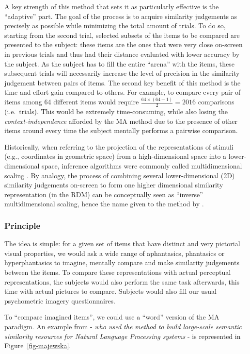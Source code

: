 \documentclass[
  authoryear]{elsarticle}
\begin{document}
A key strength of this method that sets it as particularly effective is
the ``adaptive'' part. The goal of the process is to acquire similarity
judgements as precisely as possible while minimizing the total amount of
trials. To do so, starting from the second trial, selected subsets of
the items to be compared are presented to the subject: these items are
the ones that were very close on-screen in previous trials and thus had
their distance evaluated with lower accuracy by the subject. As the
subject has to fill the entire ``arena'' with the items, these
subsequent trials will necessarily increase the level of precision in
the similarity judgement between pairs of items. The second key benefit
of this method is the time and effort gain compared to others. For
example, to compare every pair of items among 64 different items would
require \(\frac{64 \times (64-1)}{2} = 2016\) comparisons (i.e.~trials).
This would be extremely time-consuming, while also losing the
\emph{context-independence} afforded by the MA method due to the
presence of other items around every time the subject mentally performs
a pairwise comparison.

Historically, when referring to the projection of the representations of
stimuli (e.g., coordinates in geometric space) from a high-dimensional
space into a lower-dimensional space, inference algorithms were commonly
called multidimensional scaling \citep{roads2024}. By analogy, the
process of combining several lower-dimensional (2D) similarity
judgements on-screen to form one higher dimensional similarity
representation (in the RDM) can be conceptually seen as ``inverse''
multidimensional scaling, hence the name given to the method by
\citet{kriegeskorteInverseMDSInferring2012}.

\subsubsection{Principle}\label{sec-principle}

The idea is simple: for a given set of items that have distinct and very
pictorial visual properties, we would ask a wide range of aphantasics,
phantasics or hyperphantasics to imagine, mentally compare and make
similarity judgements between the items. To compare these
representations with actual perceptual representations, the subjects
would also perform the same task afterwards, this time with actual
pictures to compare. Subjects would also fill our usual psychometric
imagery questionnaires.

To ``compare imagined items'', we could use a ``word'' version of the MA
paradigm. An example from
\citet{majewskaSpatialMultiarrangementClustering2020} - \emph{who used
the method to build large-scale semantic similarity resources for
Natural Language Processing systems} - is represented in
Figure~\ref{fig-majewska}.
\end{document}
